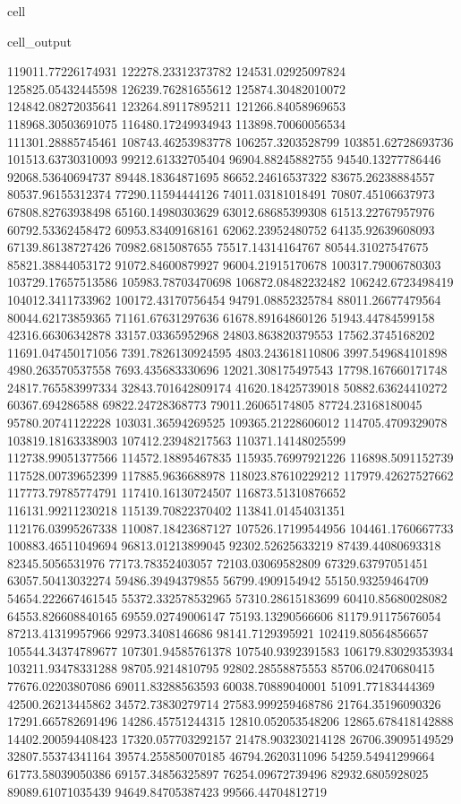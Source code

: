 \documentclass[letterpaper,10pt,english]{jupyterBook}
\begin{document}
\begin{sphinxuseclass}{cell}
\begin{sphinxVerbatimOutput}
\begin{sphinxuseclass}{cell_output}
\begin{sphinxVerbatim}[commandchars=\\\{\}]
119011.77226174931  122278.23312373782  124531.02925097824  125825.05432445598  126239.76281655612  125874.30482010072  124842.08272035641  123264.89117895211  121266.84058969653  118968.30503691075  116480.17249934943  113898.70060056534  111301.28885745461  108743.46253983778  106257.3203528799  103851.62728693736  101513.63730310093  99212.61332705404  96904.88245882755  94540.13277786446  92068.53640694737  89448.18364871695  86652.24616537322  83675.26238884557  80537.96155312374  77290.11594444126  74011.03181018491  70807.45106637973  67808.82763938498  65160.14980303629  63012.68685399308  61513.22767957976  60792.53362458472  60953.83409168161  62062.23952480752  64135.92639608093  67139.86138727426  70982.6815087655  75517.14314164767  80544.31027547675  85821.38844053172  91072.84600879927  96004.21915170678  100317.79006780303  103729.17657513586  105983.78703470698  106872.08482232482  106242.6723498419  104012.3411733962  100172.43170756454  94791.08852325784  88011.26677479564  80044.62173859365  71161.67631297636  61678.89164860126  51943.44784599158  42316.66306342878  33157.03365952968  24803.863820379553  17562.3745168202  11691.047450171056  7391.7826130924595  4803.243618110806  3997.549684101898  4980.263570537558  7693.435683330696  12021.308175497543  17798.167660171748  24817.765583997334  32843.701642809174  41620.18425739018  50882.63624410272  60367.694286588  69822.24728368773  79011.26065174805  87724.23168180045  95780.20741122228  103031.36594269525  109365.21228606012  114705.4709329078  
103819.18163338903  107412.23948217563  110371.14148025599  112738.99051377566  114572.18895467835  115935.76997921226  116898.5091152739  117528.00739652399  117885.9636688978  118023.87610229212  117979.42627527662  117773.79785774791  117410.16130724507  116873.51310876652  116131.99211230218  115139.70822370402  113841.01454031351  112176.03995267338  110087.18423687127  107526.17199544956  104461.1760667733  100883.46511049694  96813.01213899045  92302.52625633219  87439.44080693318  82345.5056531976  77173.78352403057  72103.03069582809  67329.63797051451  63057.50413032274  59486.39494379855  56799.4909154942  55150.93259464709  54654.222667461545  55372.332578532965  57310.28615183699  60410.85680028082  64553.826608840165  69559.02749006147  75193.13290566606  81179.91175676054  87213.41319957966  92973.3408146686  98141.7129395921  102419.80564856657  105544.34374789677  107301.94585761378  107540.9392391583  106179.83029353934  103211.93478331288  98705.9214810795  92802.28558875553  85706.02470680415  77676.02203807086  69011.83288563593  60038.70889040001  51091.77183444369  42500.26213445862  34572.73830279714  27583.999259468786  21764.35196090326  17291.665782691496  14286.45751244315  12810.052053548206  12865.678418142888  14402.200594408423  17320.057703292157  21478.903230214128  26706.39095149529  32807.55374341164  39574.255850070185  46794.2620311096  54259.54941299664  61773.58039050386  69157.34856325897  76254.09672739496  82932.6805928025  89089.61071035439  94649.84705387423  99566.44704812719  

\end{sphinxVerbatim}
\end{sphinxuseclass}
\end{sphinxVerbatimOutput}
\end{sphinxuseclass}
\end{document}
